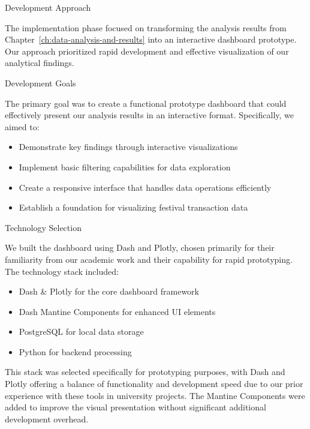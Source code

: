 \begin{section}{Development Approach}
	\label{sec:implementation-development-approach}

	The implementation phase focused on transforming the analysis results from Chapter~\ref{ch:data-analysis-and-results} into an interactive dashboard prototype. Our approach prioritized rapid development and effective visualization of our analytical findings.

	\begin{subsection}{Development Goals}
		\label{subsec:implementation-development-approach-goals}

		The primary goal was to create a functional prototype dashboard that could effectively present our analysis results in an interactive format. Specifically, we aimed to:
		\begin{itemize}
			\item Demonstrate key findings through interactive visualizations
			\item Implement basic filtering capabilities for data exploration
			\item Create a responsive interface that handles data operations efficiently
			\item Establish a foundation for visualizing festival transaction data
		\end{itemize}

	\end{subsection}

	\begin{subsection}{Technology Selection}
		\label{subsec:implementation-development-approach-technology}

		We built the dashboard using Dash and Plotly, chosen primarily for their familiarity from our academic work and their capability for rapid prototyping. The technology stack included:

		\begin{itemize}
			\item Dash \& Plotly for the core dashboard framework
			\item Dash Mantine Components for enhanced UI elements
			\item PostgreSQL for local data storage
			\item Python for backend processing
		\end{itemize}

		This stack was selected specifically for prototyping purposes, with Dash and Plotly offering a balance of functionality and development speed due to our prior experience with these tools in university projects. The Mantine Components were added to improve the visual presentation without significant additional development overhead.


\end{subsection}
\end{section}
